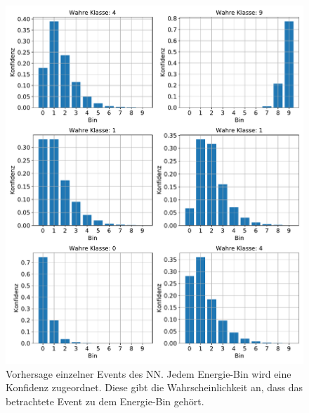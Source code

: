 \begin{figure}%
    \centering%
    \includegraphics[width=\textwidth]{Plots/NN/single_events.pdf}%
    \caption[Vorhersage einzelner Events des NN ohne DSEA]{Vorhersage einzelner Events des NN.
    Jedem Energie-Bin wird eine Konfidenz zugeordnet.
    Diese gibt die Wahrscheinlichkeit an, dass das betrachtete Event zu dem Energie-Bin gehört.
    }%
    \label{fig:NN_single_events}%
\end{figure}%

